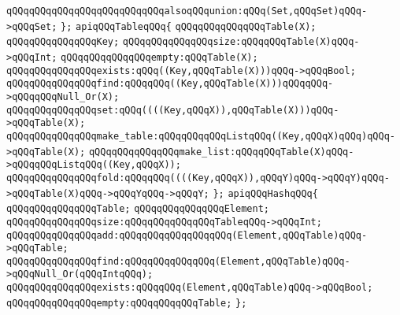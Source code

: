 \verb|qQQqqQQqqQQqqQQqqQQqqQQqqQQqalsoqQQqunion:qQQq(Set,qQQqSet)qQQq->qQQqSet;|\newline
\verb|};|\newline
\newline
\verb|apiqQQqTableqQQq{|\newline
\newline
\verb|qQQqqQQqqQQqqQQqTable(X);|\newline
\verb|qQQqqQQqqQQqqQQqKey;|\newline
\newline
\verb|qQQqqQQqqQQqqQQqsize:qQQqqQQqTable(X)qQQq->qQQqInt;|\newline
\verb|qQQqqQQqqQQqqQQqempty:qQQqTable(X);|\newline
\verb|qQQqqQQqqQQqqQQqexists:qQQq((Key,qQQqTable(X)))qQQq->qQQqBool;|\newline
\verb|qQQqqQQqqQQqqQQqfind:qQQqqQQq((Key,qQQqTable(X)))qQQqqQQq->qQQqqQQqNull_Or(X);|\newline
\verb|qQQqqQQqqQQqqQQqset:qQQq((((Key,qQQqX)),qQQqTable(X)))qQQq->qQQqTable(X);|\newline
\verb|qQQqqQQqqQQqqQQqmake_table:qQQqqQQqqQQqListqQQq((Key,qQQqX)qQQq)qQQq->qQQqTable(X);|\newline
\verb|qQQqqQQqqQQqqQQqmake_list:qQQqqQQqTable(X)qQQq->qQQqqQQqListqQQq((Key,qQQqX));|\newline
\verb|qQQqqQQqqQQqqQQqfold:qQQqqQQq((((Key,qQQqX)),qQQqY)qQQq->qQQqY)qQQq->qQQqTable(X)qQQq->qQQqYqQQq->qQQqY;|\newline
\verb|};|\newline
\newline
\verb|apiqQQqHashqQQq{|\newline
\newline
\verb|qQQqqQQqqQQqqQQqTable;|\newline
\verb|qQQqqQQqqQQqqQQqElement;|\newline
\newline
\verb|qQQqqQQqqQQqqQQqsize:qQQqqQQqqQQqqQQqTableqQQq->qQQqInt;|\newline
\verb|qQQqqQQqqQQqqQQqadd:qQQqqQQqqQQqqQQqqQQq(Element,qQQqTable)qQQq->qQQqTable;|\newline
\verb|qQQqqQQqqQQqqQQqfind:qQQqqQQqqQQqqQQq(Element,qQQqTable)qQQq->qQQqNull_Or(qQQqIntqQQq);|\newline
\verb|qQQqqQQqqQQqqQQqexists:qQQqqQQq(Element,qQQqTable)qQQq->qQQqBool;|\newline
\verb|qQQqqQQqqQQqqQQqempty:qQQqqQQqqQQqTable;|\newline
\verb|};|\newline

